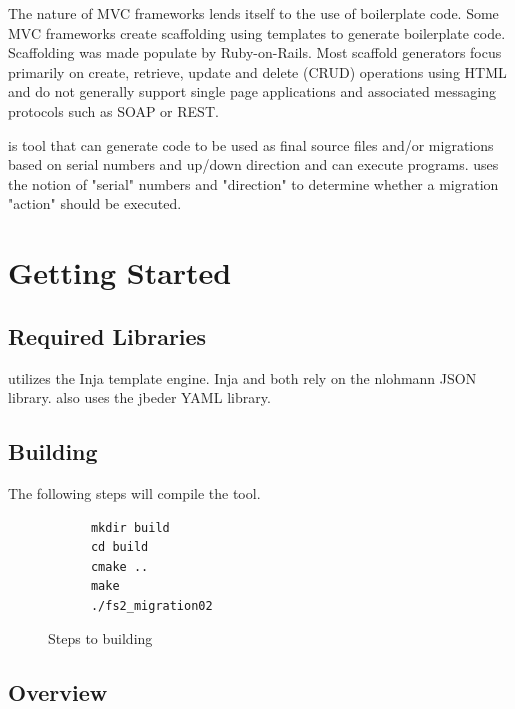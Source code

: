 \documentclass[]{article}
\begin{document}
The nature of MVC frameworks lends itself to the use of boilerplate code. Some MVC frameworks create scaffolding using templates to generate boilerplate code. Scaffolding was made populate by Ruby-on-Rails. Most scaffold generators focus primarily on create, retrieve, update and delete (CRUD) operations using HTML\cite{scaffold,vsscaffold} and do not generally support single page applications\cite{spa} and associated messaging protocols such as SOAP or REST.

 is tool that can generate code to be used as final source files and/or migrations based on serial numbers and up/down direction and can execute programs.  uses the notion of "serial" numbers and "direction" to determine whether a migration "action" should be executed.

\section{Getting Started}

\subsection{Required Libraries}
 utilizes the Inja\cite{inja} template engine. Inja and  both rely on the nlohmann JSON library\cite{nlohmann}.  also uses the jbeder YAML\cite{jbeder} library.

\subsection{Building \protect }
The following steps will compile the  tool. 
\begin{figure}[H]
	\begin{lstlisting}
	  mkdir build
	  cd build
	  cmake ..
	  make
	  ./fs2_migration02
	\end{lstlisting}
	\caption{Steps to building}
\end{figure}

\subsection{Overview}
\end{document}
